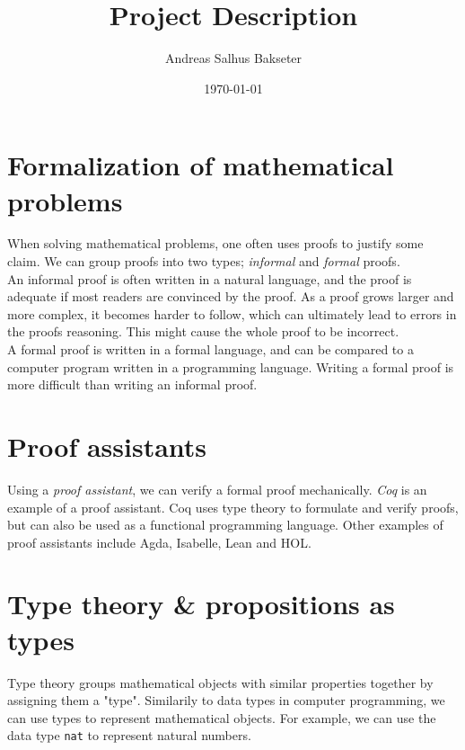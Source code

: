 \documentclass[a4paper,12pt]{article}
\title{\textbf{Project Description}}
\author{Andreas Salhus Bakseter}
\date{\today}
\begin{document}
\maketitle

\section{Formalization of mathematical problems}

When solving mathematical problems, one often uses proofs
to justify some claim. We can group proofs into two types; \textit{informal} and \textit{formal} proofs.
\\

An informal proof is often written in a natural language, and the proof is adequate if most
readers are convinced by the proof.
\supercite{bpierce}
As a proof grows larger and more complex, it becomes harder to follow, which can
ultimately lead to errors in the proofs reasoning. This might cause the whole proof
to be incorrect.
\supercite{rkhamsi}
\\

A formal proof is written in a formal language, and can be compared to a computer program
written in a programming language. Writing a formal proof is more difficult than writing an informal proof.


\section{Proof assistants}

Using a \textit{proof assistant}, we can verify a formal proof mechanically.
\textit{Coq} is an example of a proof assistant. 
Coq uses type theory to formulate and verify proofs, but can also be used as a functional programming language. \supercite{cintro}
Other examples of proof assistants include Agda, Isabelle, Lean and HOL.

\newpage

\section{Type theory \& propositions as types}

Type theory groups mathematical objects with similar properties together by assigning them a "type".
Similarily to data types in computer programming, we can use types to represent mathematical
objects. For example, we can use the data type \texttt{nat} to represent natural numbers.
\\
\end{document}
